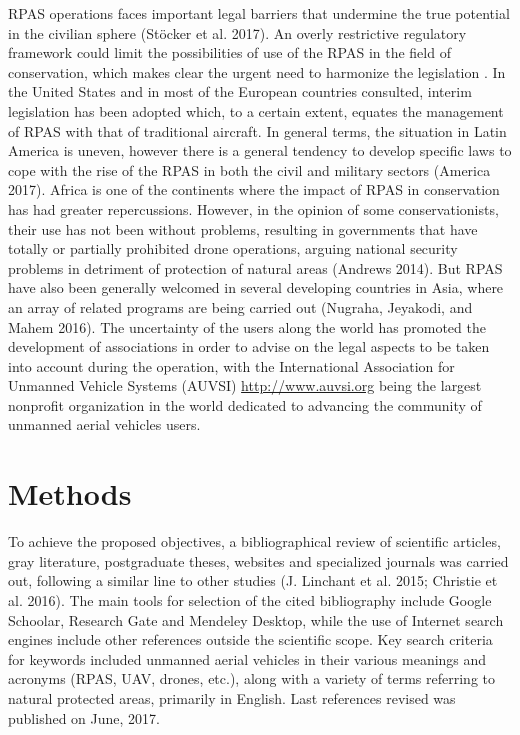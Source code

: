 \documentclass[]{interact}
\theoremstyle{plain}%
\theoremstyle{definition}
\theoremstyle{remark}
\begin{document}
RPAS operations faces important legal barriers that undermine the true
potential in the civilian sphere (Stöcker et al. 2017). An overly
restrictive regulatory framework could limit the possibilities of use of
the RPAS in the field of conservation, which makes clear the urgent need
to harmonize the legislation . In the United States and in most of the
European countries consulted, interim legislation has been adopted
which, to a certain extent, equates the management of RPAS with that of
traditional aircraft. In general terms, the situation in Latin America
is uneven, however there is a general tendency to develop specific laws
to cope with the rise of the RPAS in both the civil and military sectors
(America 2017). Africa is one of the continents where the impact of RPAS
in conservation has had greater repercussions. However, in the opinion
of some conservationists, their use has not been without problems,
resulting in governments that have totally or partially prohibited drone
operations, arguing national security problems in detriment of
protection of natural areas (Andrews 2014). But RPAS have also been
generally welcomed in several developing countries in Asia, where an
array of related programs are being carried out (Nugraha, Jeyakodi, and
Mahem 2016). The uncertainty of the users along the world has promoted
the development of associations in order to advise on the legal aspects
to be taken into account during the operation, with the International
Association for Unmanned Vehicle Systems (AUVSI)
\url{http://www.auvsi.org} being the largest nonprofit organization in
the world dedicated to advancing the community of unmanned aerial
vehicles users.

\section{Methods}\label{methods}

To achieve the proposed objectives, a bibliographical review of
scientific articles, gray literature, postgraduate theses, websites and
specialized journals was carried out, following a similar line to other
studies (J. Linchant et al. 2015; Christie et al. 2016). The main tools
for selection of the cited bibliography include Google Schoolar,
Research Gate and Mendeley Desktop, while the use of Internet search
engines include other references outside the scientific scope. Key
search criteria for keywords included unmanned aerial vehicles in their
various meanings and acronyms (RPAS, UAV, drones, etc.), along with a
variety of terms referring to natural protected areas, primarily in
English. Last references revised was published on June, 2017.
\end{document}
